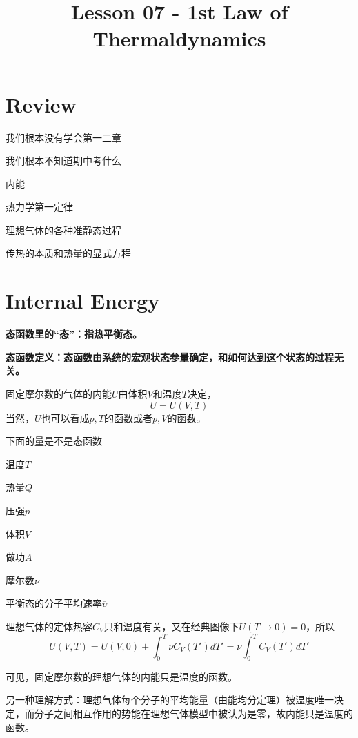 \documentclass[CJK]{beamer}
\title{Lesson 07 - 1st Law of Thermaldynamics}
\author{}
\date{}
\begin{document}


\section{Review}

\begin{frame}
\bch
\bitem
\item{我们根本没有学会第一二章}
\item{我们根本不知道期中考什么}
\eitem
\ech
\end{frame}

\begin{frame}
\bch
\bitem
\item{内能}
\item{热力学第一定律}
\item{理想气体的各种准静态过程}
\item{传热的本质和热量的显式方程}
\eitem
\ech
\end{frame}


\section{Internal Energy}

\begin{frame}
\bch
\bitem
\item{\bf 态函数里的“态”：指热平衡态。}
\item{\bf 态函数定义：态函数由系统的宏观状态参量确定，和如何达到这个状态的过程无关。}
\eitem

\bex
固定摩尔数的气体的内能$U$由体积$V$和温度$T$决定，
$$ U  = U(V, T)$$
当然，$U$也可以看成$p, T$的函数或者$p, V$的函数。
\eex

\ech
\end{frame}

\begin{frame}
\bch
下面的量是不是态函数
\bitem
\item{温度$T$}
\item{热量$Q$}
\item{压强$p$}
\item{体积$V$}
\item{做功$A$}
\item{摩尔数$\nu$}
\item{平衡态的分子平均速率$\overline{\upsilon}$}
\eitem
\ech
\end{frame}

\begin{frame}
\bch

理想气体的定体热容$C_V$只和温度有关，又在经典图像下$U(T\rightarrow 0) = 0$，所以
$$ U(V, T) = U(V, 0) + \int_0^T \nu C_V(T') dT' =\nu  \int_0^T C_V(T') dT'  $$

可见，固定摩尔数的理想气体的内能只是温度的函数。

\skiplines

另一种理解方式：理想气体每个分子的平均能量（由能均分定理）被温度唯一决定，而分子之间相互作用的势能在理想气体模型中被认为是零，故内能只是温度的函数。

\ech
\end{frame}
\end{document}
